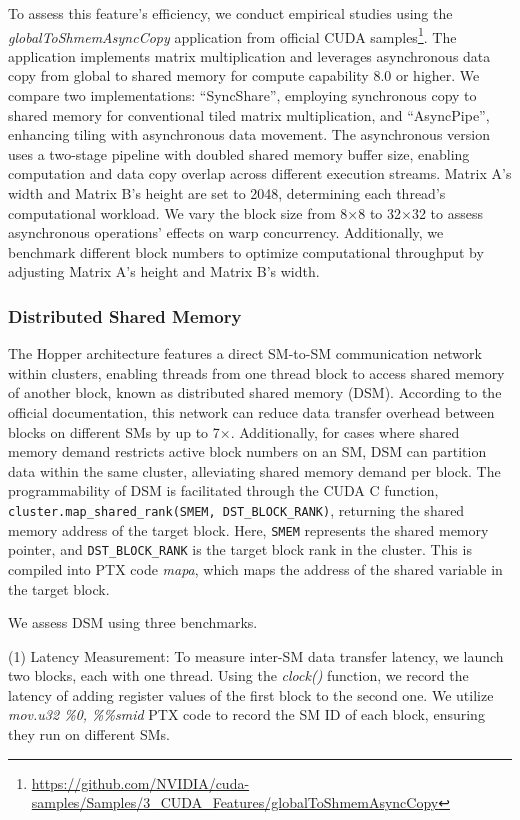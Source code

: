 To assess this feature's efficiency, we conduct empirical studies using the \textsl{globalToShmemAsyncCopy} application from official CUDA samples\footnote{\url{https://github.com/NVIDIA/cuda-samples/Samples/3_CUDA_Features/globalToShmemAsyncCopy}}. The application implements matrix multiplication and leverages asynchronous data copy from global to shared memory for compute capability 8.0 or higher. We compare two implementations: ``SyncShare'', employing synchronous copy to shared memory for conventional tiled matrix multiplication, and ``AsyncPipe'', enhancing tiling with asynchronous data movement. The asynchronous version uses a two-stage pipeline with doubled shared memory buffer size, enabling computation and data copy overlap across different execution streams. Matrix A's width and Matrix B's height are set to 2048, determining each thread's computational workload. We vary the block size from 8$\times$8 to 32$\times$32 to assess asynchronous operations' effects on warp concurrency. Additionally, we benchmark different block numbers to optimize computational throughput by adjusting Matrix A's height and Matrix B's width.
\subsubsection{Distributed Shared Memory} The Hopper architecture features a direct SM-to-SM communication network within clusters, enabling threads from one thread block to access shared memory of another block, known as distributed shared memory (DSM). According to the official documentation, this network can reduce data transfer overhead between blocks on different SMs by up to 7$\times$. Additionally, for cases where shared memory demand restricts active block numbers on an SM, DSM can partition data within the same cluster, alleviating shared memory demand per block. The programmability of DSM is facilitated through the CUDA C function, \texttt{cluster.map\_shared\_rank(SMEM, DST\_BLOCK\_RANK)}, returning the shared memory address of the target block. Here, \texttt{SMEM} represents the shared memory pointer, and \texttt{DST\_BLOCK\_RANK} is the target block rank in the cluster. This is compiled into PTX code \emph{mapa}, which maps the address of the shared variable in the target block.

We assess DSM using three benchmarks. 

(1) Latency Measurement: To measure inter-SM data transfer latency, we launch two blocks, each with one thread. Using the \emph{clock()} function, we record the latency of adding register values of the first block to the second one. We utilize \emph{mov.u32 \%0, \%\%smid} PTX code to record the SM ID of each block, ensuring they run on different SMs.

